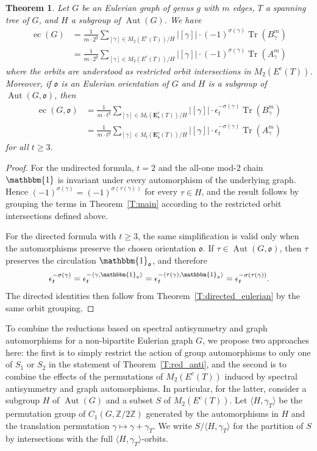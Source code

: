 \documentclass[11pt]{amsart}
\theoremstyle{plain}
\newtheorem{theorem}{Theorem}[section]
\theoremstyle{definition}
\newcommand{\mbbZ}{{\mathbb Z}}
\newcommand{\mfrako}{{\mathfrak o}}
\newcommand{\vE}{{\mathbf E}}
\DeclareMathOperator{\ec}{\operatorname{ec}}
\DeclareMathOperator{\trace}{\operatorname{Tr}}
\DeclareMathOperator{\Aut}{\operatorname{Aut}}
\numberwithin{equation}{section}
\begin{document}
\begin{theorem}\label{T:red_counting_eulerian}
Let $G$ be an Eulerian graph of genus $g$ with $m$ edges, $T$ a spanning tree of $G$, and $H$ a subgroup of $\Aut(G)$. We have
\begin{align*}
\ec(G) &=  \frac{1}{m\cdot 2^g}\sum_{[\gamma]\in M_2(E^c(T))/H}|[\gamma]|\cdot(-1)^{\sigma(\gamma)}\trace\left(B_\gamma^m\right) \\
&= \frac{1}{m\cdot 2^g}\sum_{[\gamma]\in M_2(E^c(T))/H}|[\gamma]|\cdot(-1)^{\sigma(\gamma)}\trace\left(A_{\gamma}^m\right)
 \end{align*}
where the orbits are understood as restricted orbit intersections in $M_2(E^c(T))$. Moreover, if $\mfrako$ is an Eulerian orientation of $G$ and $H$ is a subgroup of $\Aut(G,\mfrako)$, then
 \begin{align*}
\ec(G,\mfrako) &=  \frac{1}{m\cdot t^g}\sum_{[\gamma]\in M_t(\vE_\mfrako^c(T))/H}|[\gamma]| \cdot\epsilon_t^{-\sigma(\gamma)}\trace\left(B_\gamma^m\right) \\
&= \frac{1}{m\cdot t^g}\sum_{[\gamma]\in M_t(\vE_\mfrako^c(T))/H}|[\gamma]|\cdot\epsilon_t^{-\sigma(\gamma)}\trace\left(A_{\gamma}^m\right)
 \end{align*}
 for all $t\geq 3$. 
\end{theorem}
\begin{proof}
For the undirected formula, $t=2$ and the all-one mod-$2$ chain $\mathbbm{1}$ is invariant under every automorphism of the underlying graph. Hence $(-1)^{\sigma(\gamma)}=(-1)^{\sigma(\tau(\gamma))}$ for every $\tau\in H$, and the result follows by grouping the terms in Theorem~\ref{T:main} according to the restricted orbit intersections defined above.

For the directed formula with $t\geq 3$, the same simplification is valid only when the automorphisms preserve the chosen orientation $\mfrako$. If $\tau\in\Aut(G,\mfrako)$, then $\tau$ preserves the circulation $\mathbbm{1}_\mfrako$, and therefore
$$
\epsilon_t^{-\sigma(\gamma)}
=\epsilon_t^{-\langle\gamma,\mathbbm{1}_\mfrako\rangle}
=\epsilon_t^{-\langle\tau(\gamma),\mathbbm{1}_\mfrako\rangle}
=\epsilon_t^{-\sigma(\tau(\gamma))}.
$$
The directed identities then follow from Theorem~\ref{T:directed_eulerian} by the same orbit grouping.
\end{proof}

To combine the reductions based on spectral antisymmetry and graph automorphisms for a non-bipartite Eulerian graph $G$, we propose two approaches here: the first is to simply restrict the action of group automorphisms to only one of $S_1$ or $S_2$ in the statement of Theorem~\ref{T:red_anti}, and the second is to combine the effects of the permutations of $M_2(E^c(T) )$ induced by spectral antisymmetry and graph automorphisms. 
In particular, for the latter, consider a subgroup $H$ of $\Aut(G)$ and a subset $S$ of $M_2(E^c(T) )$. Let $\langle H,\gamma_T\rangle$ be the permutation group of $C_1(G,\mbbZ/2\mbbZ)$ generated by the automorphisms in $H$ and the translation permutation $\gamma\mapsto \gamma+\gamma_T$. We write $S/\langle H,\gamma_T\rangle$ for the partition of $S$ by intersections with the full $\langle H,\gamma_T\rangle$-orbits.
\end{document}
